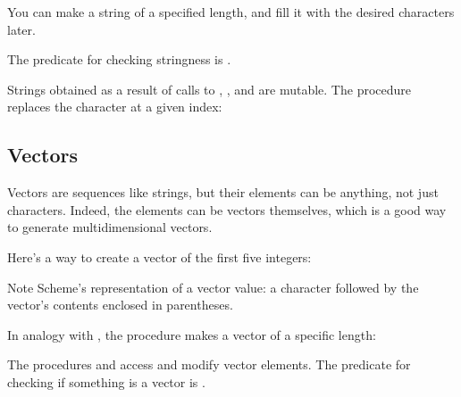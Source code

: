 {


You can make a string of a specified length, and fill it
with the desired characters later.



The predicate for checking stringness is .


Strings obtained as a result of calls to ,
, and  are mutable.
The procedure  replaces the
character at a given index:


\subsection{Vectors}

Vectors are sequences like strings, but their elements can
be anything, not just characters.  Indeed, the elements can
be vectors themselves, which is a good way to generate
multidimensional vectors.


Here's a way to create a vector of the first five integers:


\n Note Scheme's representation of a vector value: a \p{#}
character followed by the vector's contents enclosed in
parentheses.


In analogy with , the procedure
 makes a vector of a specific length:


\n The procedures  and  access and
modify vector elements.
The predicate for checking if something is a vector is .


}
